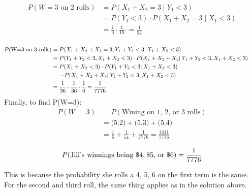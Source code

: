\documentclass{article}
\numberwithin{equation}{section}
\newcommand{\eqname}[1]{\tag*{#1}}%
\begin{document}
\begin{align} 
	    \label{W=3 on 2 rollls}
	    P(W = 3 \text{ on 2 rolls}) &= P(X_1+X_2=3\mid Y_1<3) \eqname{} \\
	    &=  P(Y_1 < 3) \cdot P(X_1+X_2=3 \mid X_1 <3) \eqname{} \\ 
	    &= \frac{1}{3}\cdot \frac{1}{18}\cdot = \frac{1}{54} \eqname{} \\
\end{align}

\begin{align} 
	    \label{W=3 on 3 rolls}
	    P(\text{W=3 on 3 rolls}) &= P(X_1+X_2+X_3 = 3 , Y_1+Y_2<3, X_1+X_2<3) \eqname{} \\
	    &= P(Y_1+Y_2<3 , X_1+X_2<3) \cdot P(X_1+X_2+X_3\vert \: Y_1+Y_2<3 , X_1+X_2 <3) \eqname{} \\
        &= P(X_1+X_2<3)\cdot P(Y_1+Y_2<3\vert \: X_1+X_2<3) \eqname{} \\ 
        & \indent \cdot  P(X_1+X_2+X_3\vert \: Y_1+Y_2<3 , X_1+X_2 <3) \eqname{} \\
        &= \frac{1}{36}\cdot \frac{1}{36}\cdot \frac{1}{6} = \frac{1}{7776} \eqname{} \\
\end{align}
Finally, to find P(W=3):
\begin{align} 
	    \label{W=3}
	    P(W\: = 3) &= P(\textrm{Wining on 1, 2, or 3 rolls}) \eqname{} \\
	    &= \text{(5.2)} + \text{(5.3)} + \text{(5.4)} \eqname{} \\
	    &= \frac{1}{6} + \frac{1}{54} + \frac{1}{7776} = \frac{1441}{7776}
\end{align}


\begin{equation}
    P(\text{Jill's winnings being \$4,\:\$5, or \$6}) = \frac{1}{7776}
\end{equation}

This is because the probability she rolls a 4, 5, 6 on the first term is the same. For the second and third roll, the same thing applies as in the solution above. \\
\end{document}
